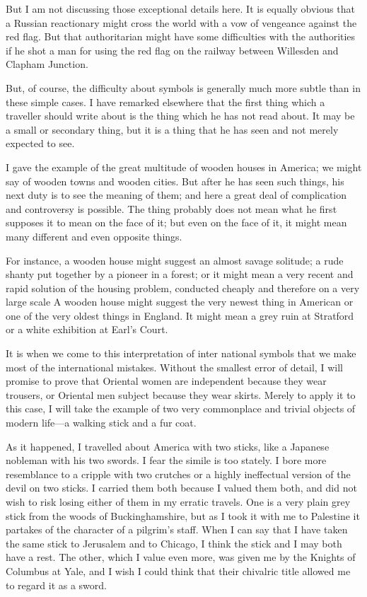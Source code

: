 \documentclass{book}
\begin{document}
But I am not discussing those exceptional details here. It is equally obvious that a Russian reactionary might cross the world with a vow of vengeance against the red flag. But that authoritarian might have some difficulties with the authorities if he shot a man for using the red flag on the railway between Willesden and Clapham Junction.

But, of course, the difficulty about symbols is generally much more subtle than in these simple cases. I have remarked elsewhere that the first thing which a traveller should write about is the thing which he has not read about. It may be a small or secondary thing, but it is a thing that he has seen and not merely expected to see.

I gave the example of the great multitude of wooden houses in America; we might say of wooden towns and wooden cities. But after he has seen such things, his next duty is to see the meaning of them; and here a great deal of complication and controversy is possible. The thing probably does not mean what he first supposes it to mean on the face of it; but even on the face of it, it might mean many different and even opposite things.

For instance, a wooden house might suggest an almost savage solitude; a rude shanty put together by a pioneer in a forest; or it might mean a very recent and rapid solution of the housing problem, conducted cheaply and therefore on a very large scale A wooden house might suggest the very newest thing in American or one of the very oldest things in England. It might mean a grey ruin at Stratford or a white exhibition at Earl’s Court.

It is when we come to this interpretation of inter national symbols that we make most of the international mistakes. Without the smallest error of detail, I will promise to prove that Oriental women are independent because they wear trousers, or Oriental men subject because they wear skirts. Merely to apply it to this case, I will take the example of two very commonplace and trivial objects of modern life—a walking stick and a fur coat.

As it happened, I travelled about America with two sticks, like a Japanese nobleman with his two swords. I fear the simile is too stately. I bore more resemblance to a cripple with two crutches or a highly ineffectual version of the devil on two sticks. I carried them both because I valued them both, and did not wish to risk losing either of them in my erratic travels. One is a very plain grey stick from the woods of Buckinghamshire, but as I took it with me to Palestine it partakes of the character of a pilgrim’s staff. When I can say that I have taken the same stick to Jerusalem and to Chicago, I think the stick and I may both have a rest. The other, which I value even more, was given me by the Knights of Columbus at Yale, and I wish I could think that their chivalric title allowed me to regard it as a sword.
\end{document}
